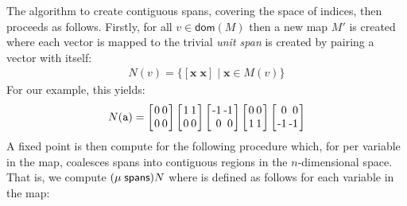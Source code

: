 \documentclass[9pt]{sigplanconf}
\theoremstyle{definition}
\newcommand{\vect}[1]{\textbf{#1}}
\newcommand{\vtwo}[2]{\setlength{\arraycolsep}{0em}
\left[\begin{array}{l}#1\\#2\end{array}\right]}
\newcommand{\stwo}[4]
{\setlength{\arraycolsep}{0.1em}
\left[\begin{array}{rr}$#1$ & $#3$\\$#2$ & $#4$\end{array}\right]}
\begin{document}
The algorithm to create contiguous spans, covering the space of
indices, then proceeds as follows.
Firstly, for all $v \in \mathsf{dom}(M)$ then a new map $M'$ is
created where each vector is mapped to the trivial \emph{unit span} is
created by pairing a vector with itself:
%
\begin{align*}
N(v) = \{[\vect{x} \;
  \vect{x}] \mid \vect{x} \in M(v)\}
\end{align*}
%
For our example, this yields:
\begin{align*}
N(\texttt{a}) = \stwo{0}{0}{0}{0} \stwo{1}{0}{1}{0} \stwo{-1}{0}{-1}{0} \stwo{0}{1}{0}{1} \stwo{0}{-1}{0}{-1}
\end{align*}
A fixed point is then compute for the following
procedure \spanOp which, for per variable
in the map, coalesces spans into contiguous regions in
the $n$-dimensional space. That is, we compute
 $(\mu \; \textsf{spans}) N$ where \spanOp
is defined as follows for each variable in the map:
%
\end{document}
